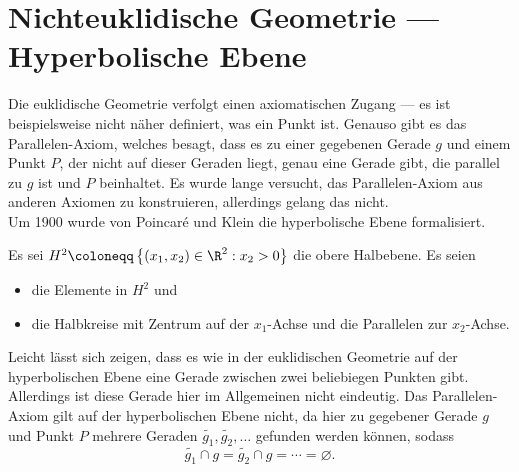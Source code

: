 \chapter{Nichteuklidische Geometrie --- Hyperbolische Ebene}

Die euklidische Geometrie verfolgt einen axiomatischen Zugang --- es ist beispielsweise nicht näher definiert, was ein Punkt ist. Genauso gibt es das Parallelen-Axiom, welches besagt, dass es zu einer gegebenen Gerade \( g \) und einem Punkt \( P \), der nicht auf dieser Geraden liegt, genau eine Gerade gibt, die parallel zu \( g \) ist und \( P \) beinhaltet. Es wurde lange versucht, das Parallelen-Axiom aus anderen Axiomen zu konstruieren, allerdings gelang das nicht. \\
Um 1900 wurde von Poincaré und Klein die hyperbolische Ebene formalisiert.

\begin{definition}
  Es sei \( H^2 \coloneqq \left \{ \left( x_1, x_2 \right) \in \R^2 : x_2 > 0 \right \} \) die obere Halbebene. Es seien
  \begin{itemize}
    \item {} die Elemente in \( H^2 \) und
    \item {} die Halbkreise mit Zentrum auf der \( x_1 \)-Achse und die Parallelen zur \( x_2 \)-Achse.
  \end{itemize}
  Leicht lässt sich zeigen, dass es wie in der euklidischen Geometrie auf der hyperbolischen Ebene eine Gerade zwischen zwei beliebiegen Punkten gibt. Allerdings ist diese Gerade hier im Allgemeinen nicht eindeutig. Das Parallelen-Axiom gilt auf der hyperbolischen Ebene nicht, da hier zu gegebener Gerade \( g \) und Punkt \( P \) mehrere Geraden \( \widetilde{g_1}, \widetilde{g_2}, \dots \) gefunden werden können, sodass
  \begin{equation*}
    \widetilde{g_1} \cap g = \widetilde{g_2} \cap g = \cdots = \varnothing\text{.}
  \end{equation*}
\end{definition}